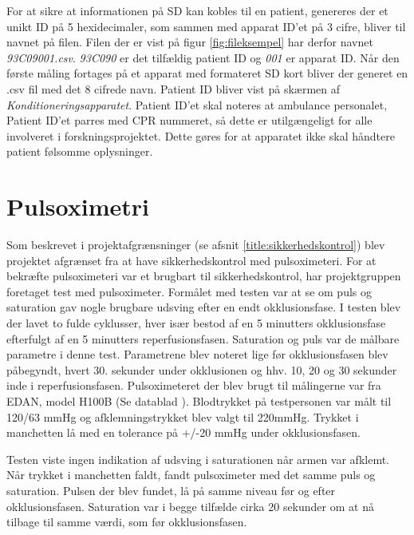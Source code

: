 For at sikre at informationen på SD kan kobles til en patient, genereres der et unikt ID på 5 hexidecimaler, som sammen med apparat ID'et på 3 cifre, bliver til navnet på filen. Filen der er vist på figur \ref{fig:fileksempel} har derfor navnet \textit{93C09001.csv}. \textit{93C090} er det tilfældig patient ID og \textit{001} er apparat ID. Når den første måling fortages på et apparat med formateret SD kort bliver der generet en .csv fil med det 8 cifrede navn. Patient ID bliver vist på skærmen af \textit{Konditioneringsapparatet}. Patient ID'et skal noteres at ambulance personalet, Patient ID'et parres med CPR nummeret, så dette er utilgængeligt for alle involveret i forskningsprojektet. Dette gøres for at apparatet ikke skal håndtere patient følsomme oplysninger.

\section{Pulsoximetri} \label{title:pulsOxi}
Som beskrevet i projektafgrænsninger (se afsnit \ref{title:sikkerhedskontrol}) blev projektet afgrænset fra at have sikkerhedskontrol med pulsoximeteri. For at bekræfte pulsoximeteri var et brugbart til sikkerhedskontrol, har projektgruppen foretaget test med pulsoximeter. Formålet med testen var at se om puls og saturation gav nogle brugbare udsving efter en endt okklusionsfase. I testen blev der lavet to fulde cyklusser, hver især bestod af en 5 minutters okklusionsfase efterfulgt af en 5 minutters reperfusionsfasen. Saturation og puls var de målbare parametre i denne test. Parametrene blev noteret lige før okklusionsfasen blev påbegyndt, hvert 30. sekunder under okklusionen og hhv. 10, 20 og 30 sekunder inde i reperfusionsfasen. Pulsoximeteret der blev brugt til målingerne var fra EDAN, model H100B (Se datablad \cite{RefWorks:30}). Blodtrykket på testpersonen var målt til 120/63 mmHg og afklemningstrykket blev valgt til 220mmHg. Trykket i manchetten lå med en tolerance på +/-20 mmHg under okklusionsfasen. 

Testen viste ingen indikation af udsving i saturationen når armen var afklemt. Når trykket i manchetten faldt, fandt pulsoximeter med det samme puls og saturation. Pulsen der blev fundet, lå på samme niveau før og efter okklusionsfasen. Saturation var i begge tilfælde cirka 20 sekunder om at nå tilbage til samme værdi, som før okklusionsfasen. 
